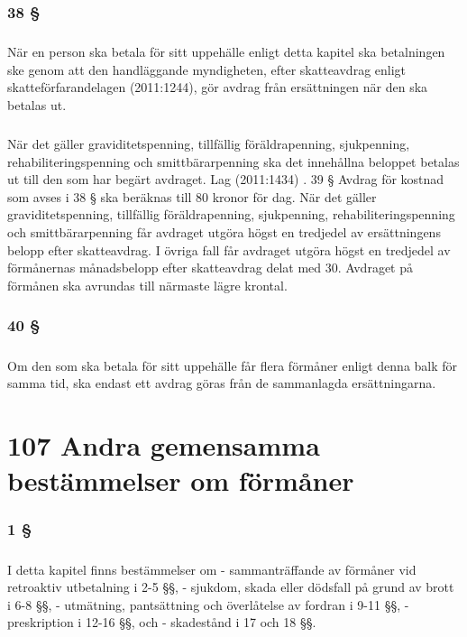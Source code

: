 \documentclass[a4paper,notitlepage,openany,10pt]{book}
\begin{document}
\subsection*{38 §}
\paragraph*{}
När en person ska betala för sitt uppehälle enligt detta kapitel ska betalningen ske genom att den handläggande myndigheten, efter skatteavdrag enligt skatteförfarandelagen (2011:1244), gör avdrag från ersättningen när den ska betalas ut.
\paragraph*{}
När det gäller graviditetspenning, tillfällig föräldrapenning, sjukpenning, rehabiliteringspenning och smittbärarpenning ska det innehållna beloppet betalas ut till den som har begärt avdraget.
Lag (2011:1434)
. 39 § Avdrag för kostnad som avses i 38 § ska beräknas till 80 kronor för dag.
När det gäller graviditetspenning, tillfällig föräldrapenning, sjukpenning, rehabiliteringspenning och smittbärarpenning får avdraget utgöra högst en tredjedel av ersättningens belopp efter skatteavdrag. I övriga fall får avdraget utgöra högst en tredjedel av förmånernas månadsbelopp efter skatteavdrag delat med 30. Avdraget på förmånen ska avrundas till närmaste lägre krontal.
\subsection*{40 §}
\paragraph*{}
Om den som ska betala för sitt uppehälle får flera förmåner enligt denna balk för samma tid, ska endast ett avdrag göras från de sammanlagda ersättningarna.
\chapter*{107 Andra gemensamma bestämmelser om förmåner}
\subsection*{1 §}
\paragraph*{}
I detta kapitel finns bestämmelser om
\newline - sammanträffande av förmåner vid retroaktiv utbetalning i 2-5 §§,
\newline - sjukdom, skada eller dödsfall på grund av brott i 6-8 §§,
\newline - utmätning, pantsättning och överlåtelse av fordran i 9-11 §§,
\newline - preskription i 12-16 §§, och
\newline - skadestånd i 17 och 18 §§.
\end{document}
